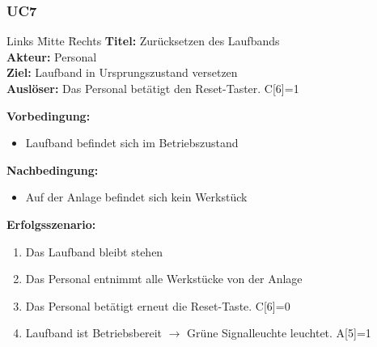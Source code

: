 \documentclass[oneside,a4paper,titlepage]{scrartcl} %
\begin{document}
\subsubsection{UC7}
\begin{tabbing}
 Links \= Mitte \= Rechts \kill
 \textbf{Titel:} \> \> Zurücksetzen des Laufbands\\
 \textbf{Akteur:} \> \> Personal\\
 \textbf{Ziel:} \> \> Laufband in Ursprungszustand versetzen\\
 \textbf{Auslöser:} \> \> Das Personal betätigt den Reset-Taster. C[6]=1\\
\end{tabbing}
\textbf{Vorbedingung:}
\begin{itemize}
 \item Laufband befindet sich im Betriebszustand
\end{itemize}
\textbf{Nachbedingung:}
\begin{itemize}
 \item Auf der Anlage befindet sich kein Werkstück
\end{itemize}
\textbf{Erfolgsszenario:}
\begin{enumerate}
 \item Das Laufband bleibt stehen
 \item Das Personal entnimmt alle Werkstücke von der Anlage
 \item Das Personal betätigt erneut die Reset-Taste. C[6]=0
 \item Laufband ist Betriebsbereit $\rightarrow$ Grüne Signalleuchte leuchtet. A[5]=1
\end{enumerate}
\end{document}
